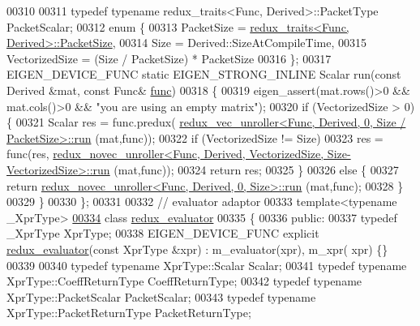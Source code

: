 \begin{DoxyCode}
00310 
00311   \textcolor{keyword}{typedef} \textcolor{keyword}{typename} redux\_traits<Func, Derived>::PacketType PacketScalar;
00312   \textcolor{keyword}{enum} \{
00313     PacketSize = \hyperlink{struct_eigen_1_1internal_1_1redux__traits}{redux\_traits<Func, Derived>::PacketSize},
00314     Size = Derived::SizeAtCompileTime,
00315     VectorizedSize = (Size / PacketSize) * PacketSize
00316   \};
00317   EIGEN\_DEVICE\_FUNC \textcolor{keyword}{static} EIGEN\_STRONG\_INLINE Scalar run(\textcolor{keyword}{const} Derived &mat, \textcolor{keyword}{const} Func& 
      \hyperlink{structfunc}{func})
00318   \{
00319     eigen\_assert(mat.rows()>0 && mat.cols()>0 && \textcolor{stringliteral}{"you are using an empty matrix"});
00320     \textcolor{keywordflow}{if} (VectorizedSize > 0) \{
00321       Scalar res = func.predux(
      \hyperlink{struct_eigen_1_1internal_1_1redux__vec__unroller}{redux\_vec\_unroller<Func, Derived, 0, Size / PacketSize>::run}
      (mat,func));
00322       \textcolor{keywordflow}{if} (VectorizedSize != Size)
00323         res = func(res,
      \hyperlink{struct_eigen_1_1internal_1_1redux__novec__unroller}{redux\_novec\_unroller<Func, Derived, VectorizedSize, Size-VectorizedSize>::run}
      (mat,func));
00324       \textcolor{keywordflow}{return} res;
00325     \}
00326     \textcolor{keywordflow}{else} \{
00327       \textcolor{keywordflow}{return} \hyperlink{struct_eigen_1_1internal_1_1redux__novec__unroller}{redux\_novec\_unroller<Func, Derived, 0, Size>::run}
      (mat,func);
00328     \}
00329   \}
00330 \};
00331 
00332 \textcolor{comment}{// evaluator adaptor}
00333 \textcolor{keyword}{template}<\textcolor{keyword}{typename} \_XprType>
\hyperlink{class_eigen_1_1internal_1_1redux__evaluator}{00334} \textcolor{keyword}{class }\hyperlink{class_eigen_1_1internal_1_1redux__evaluator}{redux\_evaluator}
00335 \{
00336 \textcolor{keyword}{public}:
00337   \textcolor{keyword}{typedef} \_XprType XprType;
00338   EIGEN\_DEVICE\_FUNC \textcolor{keyword}{explicit} \hyperlink{class_eigen_1_1internal_1_1redux__evaluator}{redux\_evaluator}(\textcolor{keyword}{const} XprType &xpr) : m\_evaluator(xpr), m\_xpr(
      xpr) \{\}
00339   
00340   \textcolor{keyword}{typedef} \textcolor{keyword}{typename} XprType::Scalar Scalar;
00341   \textcolor{keyword}{typedef} \textcolor{keyword}{typename} XprType::CoeffReturnType CoeffReturnType;
00342   \textcolor{keyword}{typedef} \textcolor{keyword}{typename} XprType::PacketScalar PacketScalar;
00343   \textcolor{keyword}{typedef} \textcolor{keyword}{typename} XprType::PacketReturnType PacketReturnType;

\end{DoxyCode}
